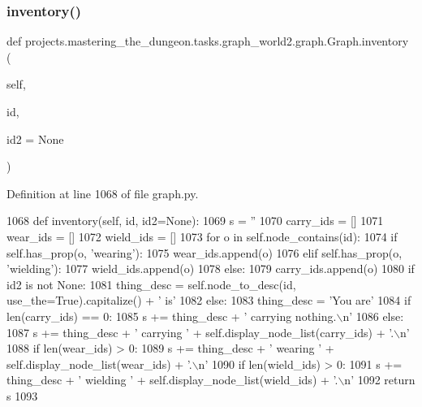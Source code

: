 \subsubsection{\texorpdfstring{inventory()}{inventory()}}
{\footnotesize\ttfamily def projects.\+mastering\+\_\+the\+\_\+dungeon.\+tasks.\+graph\+\_\+world2.\+graph.\+Graph.\+inventory (\begin{DoxyParamCaption}\item[{}]{self,  }\item[{}]{id,  }\item[{}]{id2 = {\ttfamily None} }\end{DoxyParamCaption})}



Definition at line 1068 of file graph.\+py.


\begin{DoxyCode}
1068     \textcolor{keyword}{def }inventory(self, id, id2=None):
1069         s = \textcolor{stringliteral}{''}
1070         carry\_ids = []
1071         wear\_ids = []
1072         wield\_ids = []
1073         \textcolor{keywordflow}{for} o \textcolor{keywordflow}{in} self.node\_contains(id):
1074             \textcolor{keywordflow}{if} self.has\_prop(o, \textcolor{stringliteral}{'wearing'}):
1075                 wear\_ids.append(o)
1076             \textcolor{keywordflow}{elif} self.has\_prop(o, \textcolor{stringliteral}{'wielding'}):
1077                 wield\_ids.append(o)
1078             \textcolor{keywordflow}{else}:
1079                 carry\_ids.append(o)
1080         \textcolor{keywordflow}{if} id2 \textcolor{keywordflow}{is} \textcolor{keywordflow}{not} \textcolor{keywordtype}{None}:
1081             thing\_desc = self.node\_to\_desc(id, use\_the=\textcolor{keyword}{True}).capitalize() + \textcolor{stringliteral}{' is'}
1082         \textcolor{keywordflow}{else}:
1083             thing\_desc = \textcolor{stringliteral}{'You are'}
1084         \textcolor{keywordflow}{if} len(carry\_ids) == 0:
1085             s += thing\_desc + \textcolor{stringliteral}{' carrying nothing.\(\backslash\)n'}
1086         \textcolor{keywordflow}{else}:
1087             s += thing\_desc + \textcolor{stringliteral}{' carrying '} + self.display\_node\_list(carry\_ids) + \textcolor{stringliteral}{'.\(\backslash\)n'}
1088         \textcolor{keywordflow}{if} len(wear\_ids) > 0:
1089             s += thing\_desc + \textcolor{stringliteral}{' wearing '} + self.display\_node\_list(wear\_ids) + \textcolor{stringliteral}{'.\(\backslash\)n'}
1090         \textcolor{keywordflow}{if} len(wield\_ids) > 0:
1091             s += thing\_desc + \textcolor{stringliteral}{' wielding '} + self.display\_node\_list(wield\_ids) + \textcolor{stringliteral}{'.\(\backslash\)n'}
1092         \textcolor{keywordflow}{return} s
1093 
\end{DoxyCode}
